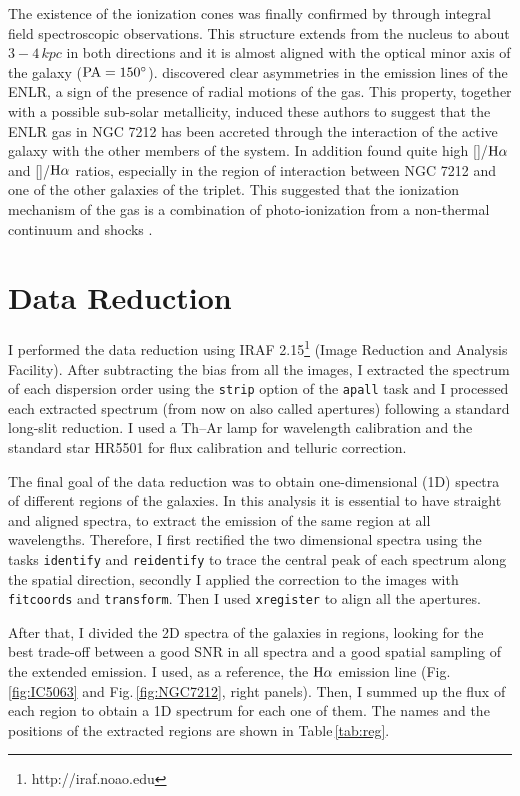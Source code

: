 \documentclass[../thesis.tex]{subfiles}
\begin{document}
The existence of the ionization cones was finally confirmed by \citet{Cracco11} through integral field spectroscopic observations.
This structure extends from the nucleus to about $3-4\,\si{kpc}$ in both directions and it is almost aligned with the optical minor axis of the galaxy ($\rm PA=\ang{150}$).
\citet{Cracco11} discovered clear asymmetries in the emission lines of the ENLR, a sign of the presence of radial motions of the gas. 
This property, together with a possible sub-solar metallicity, induced these authors to suggest that the ENLR gas in NGC 7212 has been accreted through the interaction of the active galaxy with the other members of the system. 
In addition \citet{Cracco11} found quite high []/$\rm H\alpha$ and []/$\rm H\alpha$ ratios, especially in the region of interaction between NGC 7212 and one of the other galaxies of the triplet. 
This suggested that the ionization mechanism of the gas is a combination of photo-ionization from a non-thermal continuum and shocks \citep{Contini12}.
 

\section{Data Reduction}
\label{sec:datared}

I performed the data reduction using IRAF 2.15\footnote{http://iraf.noao.edu} (Image Reduction and Analysis Facility).
After subtracting the bias from all the images, I extracted the spectrum of each dispersion order using the \verb!strip! option of the \verb!apall! task and I processed each extracted spectrum (from now on also called apertures) following a standard long-slit reduction.
I used a Th--Ar lamp for wavelength calibration and the standard star HR5501 for flux calibration and telluric correction.

The final goal of the data reduction was to obtain one-dimensional (1D) spectra of different regions of the galaxies.
In this analysis it is essential to have straight and aligned spectra, to extract the emission of the same region at all wavelengths. 
Therefore, I first rectified the two dimensional spectra using the tasks \verb!identify! and \verb!reidentify! to trace the central peak of each spectrum along the spatial direction, secondly I applied the correction to the images with \verb!fitcoords! and \verb!transform!. 
Then I used \verb!xregister! to align all the apertures.

After that, I divided the 2D spectra of the galaxies in regions, looking for the best trade-off between a good SNR in all spectra and a good spatial sampling of the extended emission.
I used, as a reference, the $\rm H\alpha$ emission line (Fig.\,\ref{fig:IC5063} and Fig.\,\ref{fig:NGC7212}, right panels).
Then, I summed up the flux of each region to obtain a 1D spectrum for each one of them.
The names and the positions of the extracted regions are shown in Table\,\ref{tab:reg}.
\end{document}

